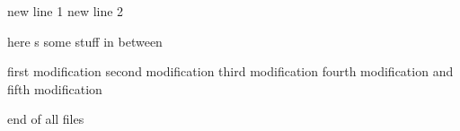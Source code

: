 new line 1
new line 2


here s some stuff in between

first modification
second modification
third modification
fourth modification and fifth modification

end of all files
